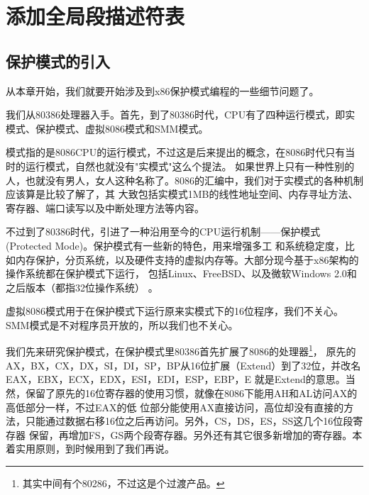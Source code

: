 
\section {添加全局段描述符表}

\subsection{保护模式的引入}

\par 从本章开始，我们就要开始涉及到x86保护模式编程的一些细节问题了。

\par 我们从80386处理器入手。首先，到了80386时代，CPU有了四种运行模式，即实模式、保护模式、虚拟8086模式和SMM模式。

\par 模式指的是8086CPU的运行模式，不过这是后来提出的概念，在8086时代只有当时的运行模式，自然也就没有"实模式"这么个提法。\allowbreak
如果世界上只有一种性别的人，也就没有男人，女人这种名称了。8086的汇编中，我们对于实模式的各种机制应该算是比较了解了，其\allowbreak
大致包括实模式1MB的线性地址空间、内存寻址方法、寄存器、端口读写以及中断处理方法等内容。

\par 不过到了80386时代，引进了一种沿用至今的CPU运行机制——保护模式(Protected Mode)。保护模式有一些新的特色，用来增强多工\allowbreak
和系统稳定度，比如内存保护，分页系统，以及硬件支持的虚拟内存等。大部分现今基于x86架构的操作系统都在保护模式下运行，\allowbreak
包括Linux、FreeBSD、以及微软Windows 2.0和之后版本（都指32位操作系统） 。

\par 虚拟8086模式用于在保护模式下运行原来实模式下的16位程序，我们不关心。SMM模式是不对程序员开放的，所以我们也不关心。

\par 我们先来研究保护模式，在保护模式里80386首先扩展了8086的处理器\footnote{其实中间有个80286，不过这是个过渡产品。}，\allowbreak
原先的AX，BX，CX，DX，SI，DI，SP，BP从16位扩展（Extend）到了32位，并改名EAX，EBX，ECX，EDX，ESI，EDI，ESP，EBP，E\allowbreak
就是Extend的意思。当然，保留了原先的16位寄存器的使用习惯，就像在8086下能用AH和AL访问AX的高低部分一样，不过EAX的低\allowbreak
位部分能使用AX直接访问，高位却没有直接的方法，只能通过数据右移16位之后再访问。另外，CS，DS，ES，SS这几个16位段寄存器\allowbreak
保留，再增加FS，GS两个段寄存器。另外还有其它很多新增加的寄存器。本着实用原则，到时候用到了我们再说。


